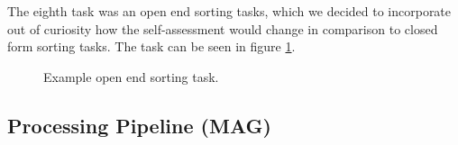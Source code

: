 \documentclass[../main/main.tex]{subfiles}
\begin{document}
	 The eighth task was an open end sorting tasks, which we decided to incorporate out of curiosity how the self-assessment would change in comparison to closed form sorting tasks. The task can be seen in figure \ref{fig:example-task2}.
	 
	 \begin{figure}[h]
	 	\label{fig:example-task2}
	 	\centering
	 	\captionsetup{justification=centering}
	 	\caption{Example open end sorting task.}
 	\end{figure} 
	 
	\newpage
	\subsection{Processing Pipeline (MAG)}
	
\end{document}
